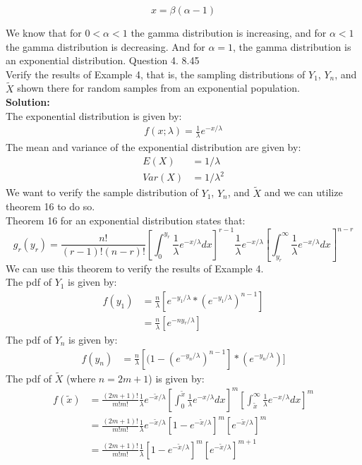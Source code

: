 \documentclass[answers,12pt,addpoints]{exam}
\begin{document}
\begin{questions}
\begin{solution}
            $$x = \beta(\alpha - 1)$$
    \end{solution}
    We know that for $0 < \alpha < 1$ the gamma distribution is increasing, and for $\alpha < 1$ the gamma distribution is decreasing.
    And for $\alpha = 1$, the gamma distribution is an exponential distribution.
    \question Question 4. 8.45\\
    Verify the results of Example 4, that is, the sampling distributions of $Y_1$, $Y_n$, and \(\tilde{X}\) shown there for random samples from an exponential population.\\
    \textbf{Solution:}\\
    The exponential distribution is given by:
    \begin{align*}
        f(x; \lambda) = \frac{1}{\lambda} e^{-x/ \lambda }
    \end{align*}
    The mean and variance of the exponential distribution are given by:
    \begin{align*}
        E(X) &= 1/\lambda \\
        Var(X) &= 1/\lambda^2
    \end{align*}
    We want to verify the sample distribution of $Y_1$, $Y_n$, and $\tilde{X}$ and we can utilize theorem 16 to do so. \\
    Theorem 16 for an exponential distribution states that: 
    $$ g_r(y_r) = \frac{n!}{(r-1)! (n-r)!} [\int_0^{y_r}\frac{1}{\lambda} e^{-x/ \lambda} dx]^{r-1} \frac{1}{\lambda} e^{-x/ \lambda} [\int_{y_r}^\infty \frac{1}{\lambda} e^{-x/ \lambda} dx]^{n-r}$$
    We can use this theorem to verify the results of Example 4.\\
    The pdf of $Y_1$ is given by:
    \begin{align*}
        f(y_1) &= \frac{n}{\lambda} [e^{-y_1 /\lambda} * (e^{-y_1 /\lambda})^{n-1}]\\
        &= \frac{n}{\lambda} [e^{-ny_r /\lambda} ] 
    \end{align*}
    The pdf of $Y_n$ is given by:
    \begin{align*}
        f(y_n) &= \frac{n}{\lambda} [(1-(e^{-y_n /\lambda})^{n-1}] * (e^{-y_n /\lambda})]
    \end{align*}
    The pdf of $\tilde{X}$ (where $n = 2m+1$) is given by:
    \begin{align*}
        f(\tilde{x}) &= \frac{(2m+1)!}{m!m!} \frac{1}{\lambda} e^{-\tilde{x}/ \lambda} \left[ \int_0^{\tilde{x}} \frac{1}{\lambda} e^{-x/ \lambda} dx \right]^m \left[ \int_{\tilde{x}}^\infty \frac{1}{\lambda} e^{-x/ \lambda} dx \right]^m\\
        &= \frac{(2m+1)!}{m!m!} \frac{1}{\lambda} e^{-\tilde{x}/ \lambda} \left[ 1 - e^{-\tilde{x}/ \lambda} \right]^m \left[ e^{-\tilde{x}/ \lambda} \right]^m\\
        &= \frac{(2m+1)!}{m!m!} \frac{1}{\lambda} \left[ 1 - e^{-\tilde{x}/ \lambda} \right]^m \left[ e^{-\tilde{x}/ \lambda} \right]^{m+1}
    \end{align*}
    

\end{questions}
\end{document}
